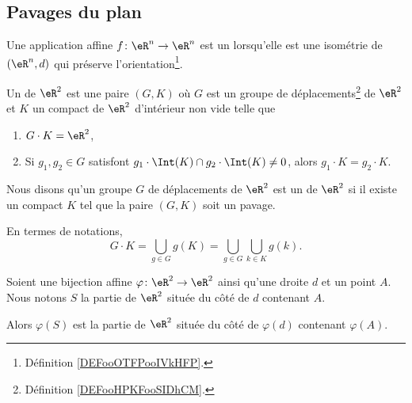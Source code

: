 
\subsection{Pavages du plan}

\begin{definition}      \label{DEFooHPKFooSIDhCM}
	Une application affine \( f\colon \eR^n\to \eR^n\) est un  lorsqu'elle est une isométrie de \( (\eR^n,d)\) qui préserve l'orientation\footnote{Définition \ref{DEFooOTFPooIVkHFP}.}.
\end{definition}

\begin{definition}      \label{DEFooJPHKooRgCBJs}
	Un  de \( \eR^2\) est une paire \( (G,K)\) où \( G\) est un groupe de déplacements\footnote{Définition \ref{DEFooHPKFooSIDhCM}.} de \( \eR^2\) et \( K\) un compact de \( \eR^2\) d'intérieur non vide telle que
	\begin{enumerate}
		\item
		      \( G\cdot K=\eR^2\),
		\item       \label{ITEMooOIJZooZMKLUm}
		      Si \( g_1,g_2\in G\) satisfont \( g_1\cdot \Int(K)\cap g_2\cdot\Int(K)\neq 0\), alors \( g_1\cdot K=g_2\cdot K\).
	\end{enumerate}
	Nous disons qu'un groupe \( G\) de déplacements de \( \eR^2\) est un  de \( \eR^2\) si il existe un compact \( K\) tel que la paire \( (G,K)\) soit un pavage.
\end{definition}

En termes de notations,
\begin{equation}
	G\cdot K=\bigcup_{g\in G}g(K)=\bigcup_{g\in G}\bigcup_{k\in K}g(k).
\end{equation}

\begin{lemma}        \label{LEMooWZSWooZYkICn}
	Soient une bijection affine \( \varphi\colon \eR^2\to \eR^2\) ainsi qu'une droite \( d\) et un point \( A\). Nous notons \( S\) la partie de \( \eR^2\) située du côté de \( d\) contenant \( A\).

	Alors \( \varphi(S)\) est la partie de \( \eR^2\) située du côté de \( \varphi(d)\) contenant \( \varphi(A)\).
\end{lemma}

